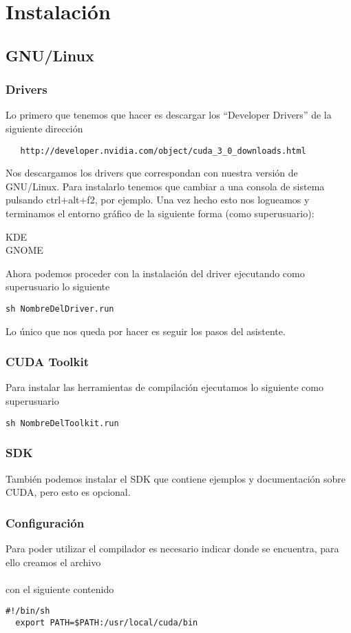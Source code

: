 \section{Instalación}
\subsection{GNU/Linux}
\subsubsection{Drivers}
Lo primero que tenemos que hacer es descargar los ``Developer Drivers'' de la siguiente dirección
  \begin{verbatim}
   http://developer.nvidia.com/object/cuda_3_0_downloads.html
  \end{verbatim}
Nos descargamos los drivers que correspondan con nuestra versión de GNU/Linux.
Para instalarlo tenemos que cambiar a una consola de sistema pulsando ctrl+alt+f2, por ejemplo. Una vez hecho esto
nos logueamos y terminamos el entorno gráfico de la siguiente forma (como superusuario):
\begin{description}
 \item[KDE] 
 \item[GNOME] 
 \end{description}
Ahora podemos proceder con la instalación del driver ejecutando como superusuario lo siguiente
  \begin{lstlisting}[style=consola]
  sh NombreDelDriver.run
  \end{lstlisting}
Lo único que nos queda por hacer es seguir los pasos del asistente.

\subsubsection{CUDA Toolkit}
Para instalar las herramientas de compilación ejecutamos lo siguiente como superusuario
  \begin{lstlisting}[style=consola]
  sh NombreDelToolkit.run
  \end{lstlisting}

\subsubsection{SDK}
También podemos instalar el SDK que contiene ejemplos y documentación sobre CUDA, pero esto es opcional.
\subsubsection{Configuración}
Para poder utilizar el compilador  es necesario indicar donde se encuentra, para ello creamos el
archivo\\
\\
con el siguiente contenido
  \begin{lstlisting}[style=BASH]
  #!/bin/sh
  export PATH=$PATH:/usr/local/cuda/bin
  \end{lstlisting}

